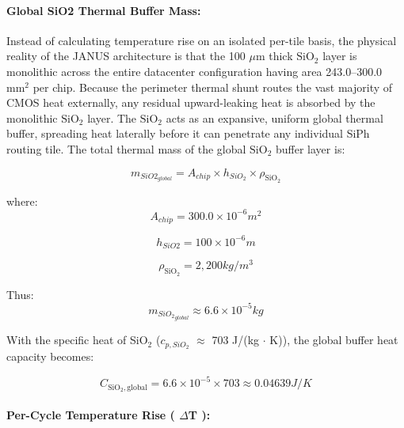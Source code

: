 \documentclass[journal]{IEEEtran}
\begin{document}
\paragraph{\textbf{Global SiO2 Thermal Buffer Mass:}}

Instead of calculating temperature rise on an isolated per-tile basis, the physical reality of the JANUS architecture is that the 100 $\mu$m thick $\mathrm{SiO_2}$ layer is monolithic across the entire datacenter configuration having area 243.0--300.0 $\text{mm}^{2}$ per chip. Because the perimeter thermal shunt routes the vast majority of CMOS heat externally, any residual upward-leaking heat is absorbed by the monolithic $\mathrm{SiO_2}$ layer. The $\mathrm{SiO_2}$ acts as an expansive, uniform global thermal buffer, spreading heat laterally before it can penetrate any individual SiPh routing tile.
The total thermal mass of the global $\mathrm{SiO_2}$ buffer layer is:

\begin{equation}
m_{SiO2_{global}} = A_{chip} \times h_{SiO_2} \times \rho_{\text{SiO}_2}
\end{equation}

where:
\begin{equation}
A_{chip} = 300.0 \times 10^{-6} m^{2}
\end{equation}

\begin{equation}
h_{SiO2} = 100 \times 10^{-6} m
\end{equation}

\begin{equation}
\rho_{\text{SiO}_2} = 2,200 kg/m^{3}
\end{equation}

Thus:
\begin{equation}
m_{{SiO_2}_{global}} \approx 6.6 \times 10^{-5} kg
\end{equation}

With the specific heat of SiO$_2$ ($c_{p,SiO_2}$ $\approx$ 703 J/(kg $\cdot$ K)), the global buffer heat capacity becomes:

\begin{equation}
C_{\text{SiO}_2, \text{global}} = 6.6 \times 10^{-5} \times 703 \approx 0.04639 J/K
\end{equation}

\paragraph{\textbf{Per-Cycle Temperature Rise ( $\Delta$T ):}}
\end{document}
